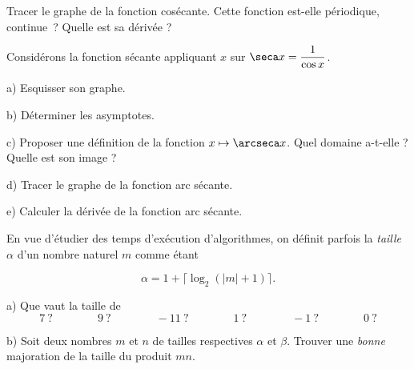 \documentclass[12pt,french,oneside,a4paper]{memoir} %
\begin{document}
\begin{exo}
Tracer le graphe de la fonction cosécante. Cette fonction
  est-elle périodique, continue~? Quelle est sa dérivée ?
\end{exo}
\begin{exo}
Considérons la fonction sécante
  appliquant $x$ sur $\displaystyle{\seca x=\frac{1}{\cos
  x}}$.
  
  a) Esquisser son graphe.
  
  b) Déterminer les asymptotes.
  
  c) Proposer une définition de la fonction $x\mapsto
  \arcseca x$. Quel domaine a-t-elle ? Quelle est son image ?
  
  d) Tracer le graphe de la fonction arc sécante.
  
  e) Calculer la dérivée de la fonction arc sécante.
\end{exo}
\begin{exo}
En vue d'étudier des temps d'exécution d'algorithmes, on
  définit parfois la {\em taille} $\alpha$ d'un nombre naturel $m$
  comme étant
  
  \begin{equation*}
  \alpha = 1 + \lceil\log_2(|m|+1)\rceil.
\end{equation*}
  
  a) Que vaut la taille de
  \begin{equation*}
  7~?\qquad\qquad 9~?\qquad\qquad -11~?\qquad\qquad 1~?
  \qquad\qquad-1~?\qquad\qquad 0~?
\end{equation*}
  
  b) Soit deux nombres $m$ et $n$ de tailles respectives $\alpha$ et
  $\beta$. Trouver une {\em \og bonne\fg{}} majoration de la taille du
  produit $mn$.
\end{exo}
\end{document}
